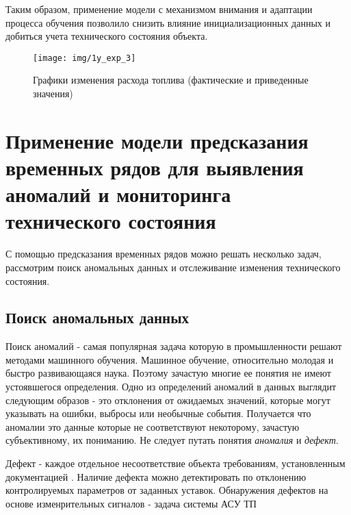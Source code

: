 \documentclass[12pt,a4paper]{article}
\begin{document}
Таким образом, применение модели с механизмом внимания и адаптации процесса обучения позволило снизить влияние инициализационных данных и добиться учета технического состояния объекта.

\begin{figure}[htbp]
	\centering\texttt{[image: img/1y\_exp\_3]}
	\caption{Графики изменения расхода топлива (фактические и приведенные значения)}
	\label{fig:1y_exp_3}
\end{figure}

\newpage
\section{Применение модели предсказания временных рядов для выявления аномалий и мониторинга технического состояния}

С помощью предсказания временных рядов можно решать несколько задач, рассмотрим поиск аномальных данных и отслеживание изменения технического состояния.

%
%
%
%
%



\subsection{Поиск аномальных данных}

Поиск аномалий - самая популярная задача которую в промышленности решают методами машинного обучения. Машинное обучение, относительно молодая и быстро развивающаяся наука. Поэтому зачастую многие ее понятия не имеют устоявшегося определения. Одно из определений аномалий в данных выглядит следующим образов - это отклонения от ожидаемых значений, которые могут указывать на ошибки, выбросы или необычные события. Получается что аномалии это данные которые не соответствуют некоторому, зачастую субъективному, их пониманию. Не следует путать понятия {\it аномалия} и {\it дефект}.

Дефект - каждое  отдельное несоответствие  объекта  требованиям, установленным документацией \cite{gost_27002}. Наличие дефекта можно детектировать по отклонению контролируемых параметров от заданных уставок.
Обнаружения дефектов на основе изменрительных сигналов - задача системы АСУ ТП
\end{document}
